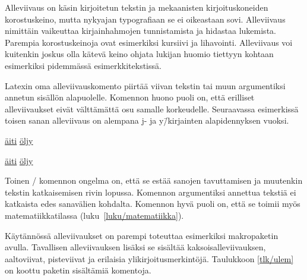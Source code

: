 Alleviivaus on käsin kirjoitetun tekstin ja mekaanisten
kirjoituskoneiden korostuskeino, mutta nykyajan typografiaan se ei
oikeastaan sovi. Alleviivaus nimittäin vaikeuttaa kirjainhahmojen
tunnistamista ja hidastaa lukemista. Parempia korostuskeinoja ovat
esimerkiksi kursiivi ja lihavointi. Alleviivaus voi kuitenkin joskus
olla kätevä keino ohjata lukijan huomio tiettyyn kohtaan esimerkiksi
pidemmässä esimerkkitekstissä.

Latexin oma alleviivauskomento  piirtää viivan
tekstin tai muun argumentiksi annetun sisällön alapuolelle. Komennon
huono puoli on, että erilliset alleviivaukset eivät välttämättä osu
samalle korkeudelle. Seuraavassa esimerkissä toisen sanan alleviivaus on
alempana j- ja y\=/kirjainten alapidennyksen vuoksi.

\begin{koodilohkosis}
\underline{äiti} \underline{öljy}
\end{koodilohkosis}

\begin{tulossis}
  \underline{äiti} \underline{öljy}
\end{tulossis}

Toinen \-/ komennon ongelma on, että se estää sanojen
tavuttamisen ja muutenkin tekstin katkaisemisen rivin lopussa. Komennon
argumentiksi annettua tekstiä ei katkaista edes sanavälien kohdalta.
Komennon hyvä puoli on, että se toimii myös matematiikkatilassa
(luku~\ref{luku/matematiikka}).

Käytännössä alleviivaukset on parempi toteuttaa esimerkiksi makropaketin
 avulla. Tavallisen alleviivauksen lisäksi
se sisältää kaksoisalleviivauksen, aaltoviivat, pisteviivat ja erilaisia
ylikirjoitusmerkintöjä. Taulukkoon \ref{tlk/ulem} on koottu paketin
sisältämiä komentoja.


